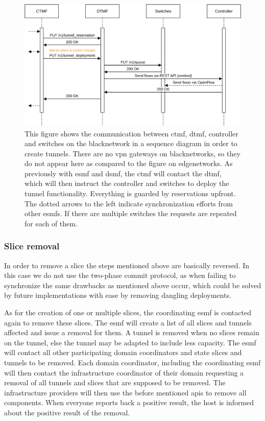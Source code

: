 \begin{figure}[H]
    \centering
    \includegraphics[width=\linewidth]{images/chapter_6/slice_creation_bn.png}
    \caption[Slice creation on a \gls{blacknetwork}]{This figure shows the communication between \acrshort{ctmf}, \acrshort{dtmf}, controller and switches on the \gls{blacknetwork} in a sequence diagram in order to create tunnels. There are no \acrshort{vpn} gateways on \gls{blacknetwork}s, so they do not appear here as compared to the figure on \gls{edgenetwork}s. As previously with \acrshort{esmf} and \acrshort{dsmf}, the \acrshort{ctmf} will contact the \acrshort{dtmf}, which will then instruct the controller and switches to deploy the tunnel functionality. Everything is guarded by reservations upfront. The dotted arrows to the left indicate synchronization efforts from other \acrshort{esmf}s. If there are multiple switches the requests are repeated for each of them.}
    \label{fig:slice_creation_bn}
\end{figure}

\newpage

\subsubsection{Slice removal}
In order to remove a slice the steps mentioned above are basically reversed. In this case we do not use the two-phase commit protocol, as when failing to synchronize the same drawbacks as mentioned above occur, which could be solved by future implementations with ease by removing dangling deployments.

As for the creation of one or multiple slices, the coordinating \acrshort{esmf} is contacted again to remove these slices. The \acrshort{esmf} will create a list of all slices and tunnels affected and issue a removal for them. A tunnel is removed when no slices remain on the tunnel, else the tunnel may be adapted to include less capacity. The \acrshort{esmf} will contact all other participating domain coordinators and state slices and tunnels to be removed. Each domain coordinator, including the coordinating \acrshort{esmf} will then contact the infrastructure coordinator of their domain requesting a removal of all tunnels and slices that are supposed to be removed. The infrastructure providers will then use the before mentioned \acrshort{api}s to remove all components. When everyone reports back a positive result, the host is informed about the positive result of the removal.

